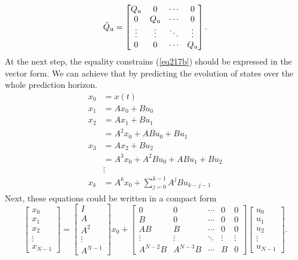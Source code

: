 \begin{equation}
\tilde{Q} _{\text{u}} = \begin{bmatrix}
Q _{\text{u}}&0&\cdots&0\\
0&Q _{\text{u}}&\cdots&0\\
\vdots&\vdots&\ddots&\vdots\\
0&0&\cdots&Q _{\text{u}}
\end{bmatrix}.
\end{equation}
At the next step, the equality constrains (\ref{eq217b}) should be expressed in the vector form. We can achieve that by predicting the evolution of states over the whole prediction horizon.
\begin{equation}
\begin{split}
x_0 &= x(t)\\
x_{1} &= Ax_0 + Bu_0\\
x_{2} &= Ax_{1} + Bu_{1}\\
&= A^2x_0 + ABu_0 + Bu_{1}\\
x_{3} &= Ax_{2} + Bu_{2}\\
&= A^3x_0 + A^2Bu_0 + ABu_{1} + Bu_{2}\\
&\vdots\\
x_{k} &= A^kx_0+\sum_{j=0}^{k-1}A^jBu_{k-j-1}
\end{split}
\end{equation}
Next, these equations could be written in a compact form
\begin{equation}
	\begin{bmatrix}
	x_0\\x_{1}\\ x_{2}\\\vdots\\ x_{N-1}
	\end{bmatrix} = 
	\begin{bmatrix}I\\A\\A^2\\ \vdots \\ A^{N-1}\end{bmatrix}x_0 + 
	\begin{bmatrix}
	0& 0&\cdots&0&0\\
	B&0&\cdots&0&0\\
	AB&B&\cdots&0&0\\
	\vdots&\vdots&\ddots&\vdots&\vdots\\
	A^{N-2}B&A^{N-3}B&\cdots&B&0\end{bmatrix}
	\begin{bmatrix}u_0\\u_{1}\\u_{2}\\\vdots\\u_{N-1}\end{bmatrix}.
\end{equation}
